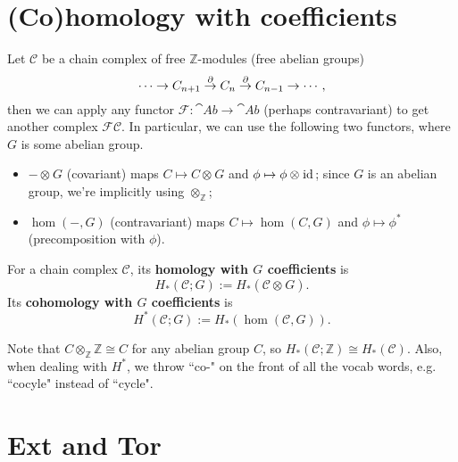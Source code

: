 \documentclass[twoside,10pt]{article}
\begin{document}

\section{(Co)homology with coefficients}

Let $\mathcal{C}$ be a chain complex of free $\mathbb{Z}$-modules (free abelian groups)
\[
\cdots \to C_{n+1} \stackrel{\partial}{\to }  C_{n}\stackrel{\partial}{\to} C_{n-1}\to  \cdots,
\] then we can apply any functor $\mathcal{F}:\cat{Ab} \to \cat{Ab}$ (perhaps contravariant) to get another complex $\mathcal{F}\mathcal{C}$. In particular, we can use the following two functors, where $G$ is some abelian group.
\begin{itemize}
	\item $- \otimes_{} G$ (covariant) maps $C \mapsto C \otimes_{}G$ and $\phi \mapsto \phi \otimes_{} \operatorname{id}_{}$; since $G$ is an abelian group, we're implicitly using $\otimes_{\mathbb{Z}}$;
	\item $\hom(-,G)$ (contravariant) maps $C \mapsto \hom(C,G)$ and $\phi \mapsto \phi^{*}$ (precomposition with $\phi$).
\end{itemize}

\begin{defn}[]
	For a chain complex $\mathcal{C}$, its \textbf{homology with $G$ coefficients} is
	\[
		H_{*}(\mathcal{C}; G) := H_{*}(\mathcal{C} \otimes_{}G).
	\] Its \textbf{cohomology with $G$ coefficients} is
	\[
		H^{*}(\mathcal{C}; G) := H_{*}(\hom(\mathcal{C},G)).
	\] 
\end{defn}

Note that $C \otimes_{\mathbb{Z}}\mathbb{Z} \cong C$ for any abelian group $C$, so $H_{*}(\mathcal{C};\mathbb{Z}) \cong H_{*}(\mathcal{C})$. Also, when dealing with $H^{*}$, we throw ``co-" on the front of all the vocab words, e.g. ``cocyle" instead of ``cycle".


\section{Ext and Tor}
\end{document}
